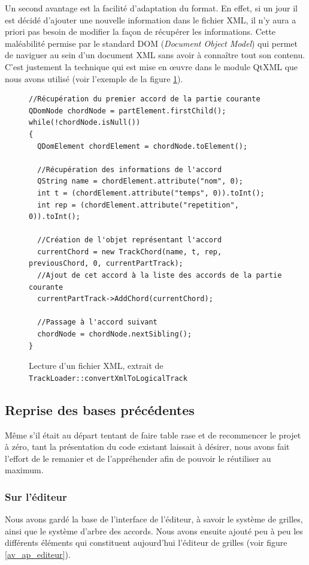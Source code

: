 \documentclass[a4paper,11pt]{article}
\begin{document}
Un second avantage est la facilité d'adaptation du format. En effet, si un jour il est décidé d'ajouter une nouvelle information dans le fichier XML, il n'y aura a priori pas besoin de modifier la façon de récupérer les informations. Cette maléabilité permise par le standard DOM (\textit{Document Object Model}) qui permet de naviguer au sein d'un document XML sans avoir à connaître tout son contenu. C'est justement la technique qui est mise en \oe uvre dans le module QtXML que nous avons utilisé (voir l'exemple de la figure \ref{xml_dom}).

\begin{figure}[H]
\begin{lstlisting}
//Récupération du premier accord de la partie courante
QDomNode chordNode = partElement.firstChild();
while(!chordNode.isNull())
{
  QDomElement chordElement = chordNode.toElement();
  
  //Récupération des informations de l'accord
  QString name = chordElement.attribute("nom", 0);
  int t = (chordElement.attribute("temps", 0)).toInt();
  int rep = (chordElement.attribute("repetition", 0)).toInt();
  
  //Création de l'objet représentant l'accord
  currentChord = new TrackChord(name, t, rep, previousChord, 0, currentPartTrack);
  //Ajout de cet accord à la liste des accords de la partie courante
  currentPartTrack->AddChord(currentChord);

  //Passage à l'accord suivant
  chordNode = chordNode.nextSibling();
}
\end{lstlisting}
\caption{Lecture d'un fichier XML, extrait de \texttt{TrackLoader::convertXmlToLogicalTrack}}
\label{xml_dom}
\end{figure}

\subsection{Reprise des bases précédentes}

Même s'il était au départ tentant de faire table rase et de recommencer le projet à zéro, tant la présentation du code existant laissait à désirer, nous avons fait l'effort de le remanier et de l'appréhender afin de pouvoir le réutiliser au maximum.

\subsubsection{Sur l'éditeur}

Nous avons gardé la base de l'interface de l'éditeur, à savoir le système de grilles, ainsi que le système d'arbre des accords. Nous avons ensuite ajouté peu à peu les différents éléments qui constituent aujourd'hui l'éditeur de grilles (voir figure \ref{av_ap_editeur}).
\end{document}
